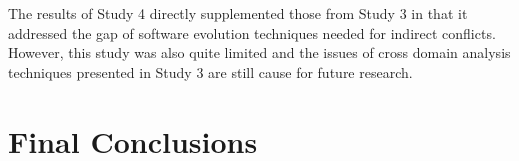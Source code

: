 The results of Study 4 directly supplemented those from Study 3 in that it addressed the gap of software evolution techniques
needed for indirect conflicts. However, this study was also quite limited and the issues of cross domain analysis techniques
presented in Study 3 are still cause for future research.

\section{Final Conclusions}
